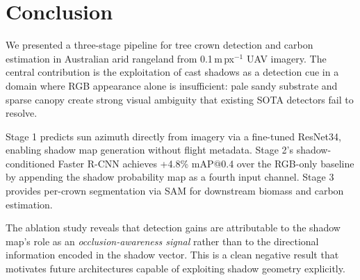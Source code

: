 \documentclass[10pt,twocolumn]{article}
\begin{document}
\section{Conclusion}

We presented a three-stage pipeline for tree crown detection and carbon
estimation in Australian arid rangeland from 0.1\,m\,px$^{-1}$ UAV imagery.
The central contribution is the exploitation of cast shadows as a detection
cue in a domain where RGB appearance alone is insufficient: pale sandy
substrate and sparse canopy create strong visual ambiguity that existing
SOTA detectors fail to resolve.

Stage 1 predicts sun azimuth directly from imagery via a fine-tuned ResNet34,
enabling shadow map generation without flight metadata. Stage 2's shadow-conditioned
Faster R-CNN achieves +4.8\% mAP@0.4 over the RGB-only baseline by appending
the shadow probability map as a fourth input channel. Stage 3 provides per-crown
segmentation via SAM for downstream biomass and carbon estimation.

The ablation study reveals that detection gains are attributable to the shadow
map's role as an \emph{occlusion-awareness signal} rather than to the
directional information encoded in the shadow vector. This is a clean negative
result that motivates future architectures capable of exploiting shadow
geometry explicitly.



\end{document}

